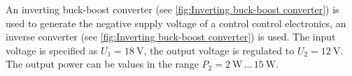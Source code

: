 

An inverting buck-boost converter (see \autoref{fig:Inverting buck-boost converter}) is used to generate the negative supply voltage of a control control electronics, an inverse converter (see \autoref{fig:Inverting buck-boost converter}) is used. The input voltage is specified as $U_\mathrm{1}=\SI{18}{\volt}$, the output voltage is regulated to $U_\mathrm{2}=\SI{12}{\volt}$. The output power can be values in the range $P_\mathrm{2} = \SI{2}{\watt} \, \dots \, \SI{15}{\watt}$.





